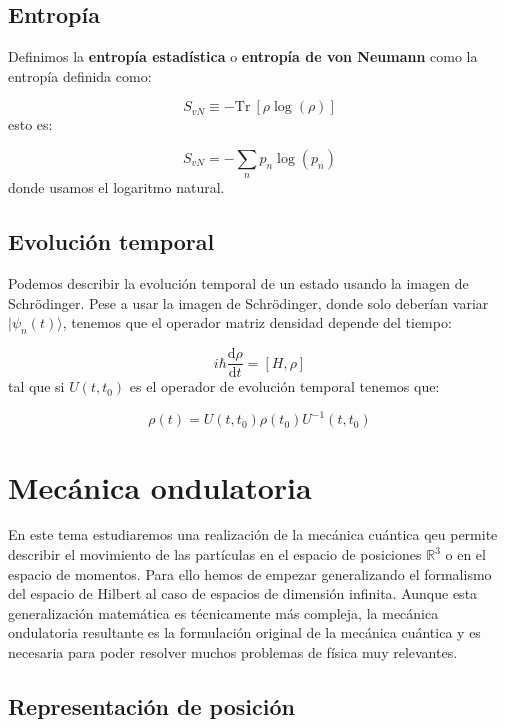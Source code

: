 \documentclass[12pt,a4paper]{book}
\numberwithin{equation}{chapter}
\numberwithin{figure}{chapter}
\newcommand{\ccorchetes}[1]{\left[ #1  \right]}
\newcommand{\D}{\mathrm{d}}
\newcommand{\derivadas}[2]{\frac{\D #1}{\D #2}}
\newcommand{\Tr}{\mathrm{Tr} \ }
\begin{document}
\section{Entropía}

Definimos la \textbf{entropía estadística} o \textbf{entropía de von Neumann} como la entropía definida como:

\begin{equation}
S_{vN} \equiv - \Tr \ccorchetes{\rho \log (\rho)}
\end{equation}
esto es:

\begin{equation}
S_{vN} = - \sum_n p_n \log (p_n)
\end{equation}
donde usamos el logaritmo natural. 

\section{Evolución temporal}

Podemos describir la evolución temporal de un estado usando la imagen de Schrödinger. Pese a usar la imagen de Schrödinger, donde solo deberían variar $| \psi_n(t) \rangle$, tenemos que el operador matriz densidad depende del tiempo: 


\begin{equation}
i \hbar \derivadas{\rho}{t} = [H, \rho]
\end{equation}
tal que si $U(t,t_0)$ es el operador de evolución temporal tenemos que:

\begin{equation}
\rho (t) = U (t,t_0) \rho (t_0) U^{-1} (t,t_0)
\end{equation}

\chapter{Mecánica ondulatoria}

En este tema estudiaremos una realización de la mecánica cuántica qeu permite describir el movimiento de las partículas en el espacio de posiciones $\mathbb{R}^3$ o en el espacio de momentos. Para ello hemos de empezar generalizando el formalismo del espacio de Hilbert al caso de espacios de dimensión infinita. Aunque esta generalización matemática es técnicamente más compleja, la mecánica ondulatoria resultante es la formulación original de la mecánica cuántica y es necesaria para poder resolver muchos problemas de física muy relevantes. 


\section{Representación de posición}
\end{document}
